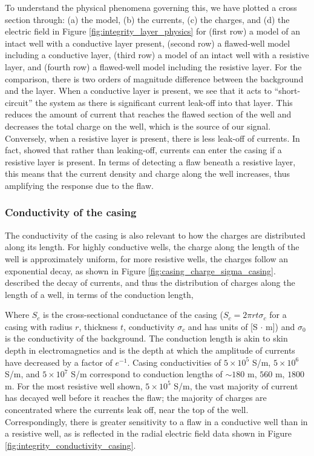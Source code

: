 To understand the physical phenomena governing this, we have plotted a cross section through: (a) the model, (b) the currents, (c) the charges, and (d) the electric field in Figure \ref{fig:integrity_layer_physics} for (first row) a model of an intact well with a conductive layer present, (second row) a flawed-well model including a conductive layer, (third row) a model of an intact well with a resistive layer, and (fourth row) a flawed-well model including the resistive layer. For the comparison, there is two orders of magnitude difference between the background and the layer. When a conductive layer is present, we see that it acts to ``short-circuit'' the system as there is significant current leak-off into that layer. This reduces the amount of current that reaches the flawed section of the well and decreases the total charge on the well, which is the source of our signal. Conversely, when a resistive layer is present, there is less leak-off of currents. In fact, \cite{Yang2016} showed that rather than leaking-off, currents can enter the casing if a resistive layer is present. In terms of detecting a flaw beneath a resistive layer, this means that the current density and charge along the well increases, thus amplifying the response due to the flaw.



\subsubsection{Conductivity of the casing}
The conductivity of the casing is also relevant to how the charges are distributed along its length. For highly conductive wells, the charge along the length of the well is approximately uniform, for more resistive wells, the charges follow an exponential decay, as shown in Figure \ref{fig:casing_charge_sigma_casing}. \cite{Schenkel1991} described the decay of currents, and thus the distribution of charges along the length of a well, in terms of the conduction length,

Where $S_c$ is the cross-sectional conductance of the casing ($S_c = 2\pi r t \sigma_c$ for a casing with radius $r$, thickness $t$, conductivity $\sigma_c$ and has units of [S $\cdot$ m]) and $\sigma_0$ is the conductivity of the background. The conduction length is akin to skin depth in electromagnetics and is the depth at which  the amplitude of currents have decreased by a factor of $e^{-1}$. Casing conductivities of $5 \times 10^5$ S/m, $5 \times 10^6$ S/m, and $5 \times 10^7$ S/m correspond to conduction lengths of $\sim 180$ m, $560$ m, $1800$ m. For the most resistive well shown, $5 \times 10^{5}$ S/m, the vast majority of current has decayed well before it reaches the flaw; the majority of charges are concentrated where the currents leak off, near the top of the well. Correspondingly, there is greater sensitivity to a flaw in a conductive well than in a resistive well, as is reflected in the radial electric field data shown in Figure \ref{fig:integrity_conductivity_casing}.



